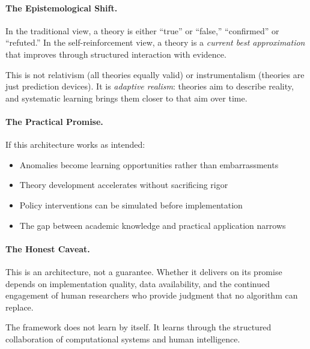 \paragraph{The Epistemological Shift.}
In the traditional view, a theory is either ``true'' or ``false,'' ``confirmed'' 
or ``refuted.'' In the self-reinforcement view, a theory is a \emph{current 
best approximation} that improves through structured interaction with evidence.

This is not relativism (all theories equally valid) or instrumentalism (theories 
are just prediction devices). It is \emph{adaptive realism}: theories aim to 
describe reality, and systematic learning brings them closer to that aim over 
time.

\paragraph{The Practical Promise.}
If this architecture works as intended:
\begin{itemize}
    \item Anomalies become learning opportunities rather than embarrassments
    \item Theory development accelerates without sacrificing rigor
    \item Policy interventions can be simulated before implementation
    \item The gap between academic knowledge and practical application narrows
\end{itemize}

\paragraph{The Honest Caveat.}
This is an architecture, not a guarantee. Whether it delivers on its promise 
depends on implementation quality, data availability, and the continued 
engagement of human researchers who provide judgment that no algorithm can 
replace.

The framework does not learn by itself. It learns through the structured 
collaboration of computational systems and human intelligence.

\begin{center}
\end{center}

